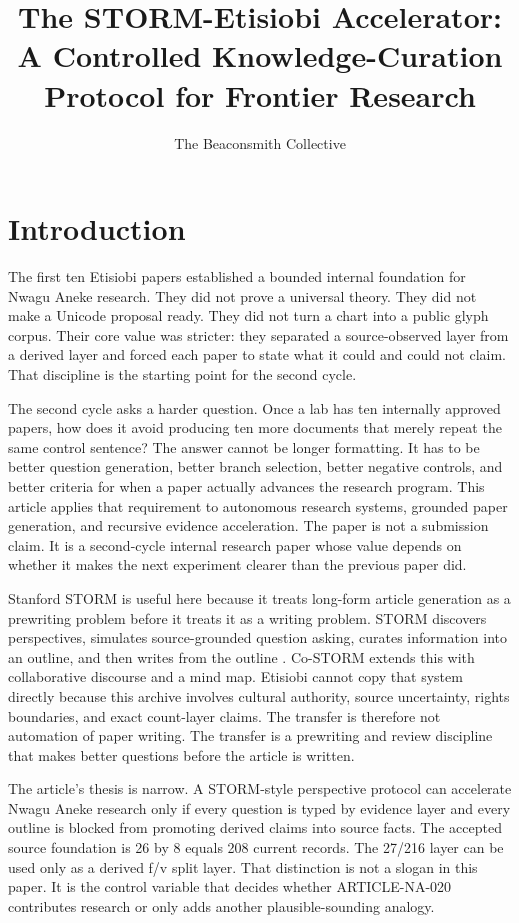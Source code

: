 \documentclass[sigconf,nonacm]{acmart}
\title{The STORM-Etisiobi Accelerator: A Controlled Knowledge-Curation Protocol for Frontier Research}
\author{The Beaconsmith Collective}
\affiliation{\institution{Etisiobi Research Studio}\city{Enugu}\country{Nigeria}}
\begin{document}
\maketitle

\section{Introduction}
The first ten Etisiobi papers established a bounded internal foundation for
Nwagu Aneke research. They did not prove a universal theory. They did not make a
Unicode proposal ready. They did not turn a chart into a public glyph corpus.
Their core value was stricter: they separated a source-observed layer from a
derived layer and forced each paper to state what it could and could not claim.
That discipline is the starting point for the second cycle.

The second cycle asks a harder question. Once a lab has ten internally approved
papers, how does it avoid producing ten more documents that merely repeat the
same control sentence? The answer cannot be longer formatting. It has to be
better question generation, better branch selection, better negative controls,
and better criteria for when a paper actually advances the research program.
This article applies that requirement to autonomous research systems, grounded paper generation, and recursive evidence acceleration. The paper is not a submission
claim. It is a second-cycle internal research paper whose value depends on
whether it makes the next experiment clearer than the previous paper did.

Stanford STORM is useful here because it treats long-form article generation as
a prewriting problem before it treats it as a writing problem. STORM discovers
perspectives, simulates source-grounded question asking, curates information
into an outline, and then writes from the outline \cite{shao2024storm,jiang2024costorm,gao2023alce,wadden2020scifact}. Co-STORM
extends this with collaborative discourse and a mind map. Etisiobi cannot copy
that system directly because this archive involves cultural authority, source
uncertainty, rights boundaries, and exact count-layer claims. The transfer is
therefore not automation of paper writing. The transfer is a prewriting and
review discipline that makes better questions before the article is written.

The article's thesis is narrow. A STORM-style perspective protocol can accelerate
Nwagu Aneke research only if every question is typed by evidence layer and every
outline is blocked from promoting derived claims into source facts. The accepted
source foundation is 26 by 8 equals 208 current records. The 27/216 layer can be
used only as a derived f/v split layer. That distinction is not a slogan in this
paper. It is the control variable that decides whether ARTICLE-NA-020 contributes
research or only adds another plausible-sounding analogy.
\end{document}
